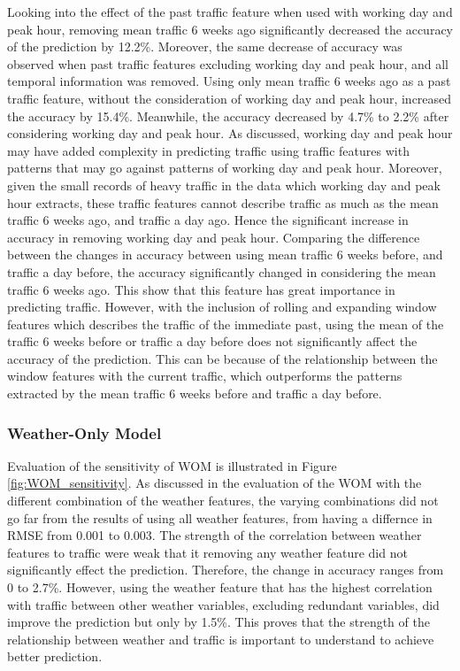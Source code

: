 Looking into the effect of the past traffic feature when used with working day and peak hour, removing mean traffic 6 weeks ago significantly decreased the accuracy of the prediction by 12.2\%. Moreover, the same decrease of accuracy was observed when past traffic features excluding working day and peak hour, and all temporal information was removed. Using only mean traffic 6 weeks ago as a past traffic feature, without the consideration of working day and peak hour, increased the accuracy by 15.4\%. Meanwhile, the accuracy decreased by 4.7\% to 2.2\% after considering working day and peak hour. As discussed, working day and peak hour may have added complexity in predicting traffic using traffic features with patterns that may go against patterns of working day and peak hour. Moreover, given the small records of heavy traffic in the data which working day and peak hour extracts, these traffic features cannot describe traffic as much as the mean traffic 6 weeks ago, and traffic a day ago. Hence the significant increase in accuracy in removing working day and peak hour. Comparing the difference between the changes in accuracy between using mean traffic 6 weeks before, and traffic a day before, the accuracy significantly changed in considering the mean traffic 6 weeks ago. This show that this feature has great importance in predicting traffic. However, with the inclusion of rolling and expanding window features which describes the traffic of the immediate past, using the mean of the traffic 6 weeks before or traffic a day before does not significantly affect the accuracy of the prediction. This can be because of the relationship between the window features with the current traffic, which outperforms the patterns extracted by the mean traffic 6 weeks before and traffic a day before. 


\subsubsection{Weather-Only Model}
Evaluation of the sensitivity of WOM is illustrated in Figure \ref{fig:WOM_sensitivity}. As discussed in the evaluation of the WOM with the different combination of the weather features, the varying combinations did not go far from the results of using all weather features, from having a differnce in RMSE from 0.001 to 0.003. The strength of the correlation between weather features to traffic were weak that it removing any weather feature did not significantly effect the prediction. Therefore, the change in accuracy ranges from 0 to 2.7\%. However, using the weather feature that has the highest correlation with traffic between other weather variables, excluding redundant variables, did improve the prediction but only by 1.5\%. This proves that the strength of the relationship between weather and traffic is important to understand to achieve better prediction. 


